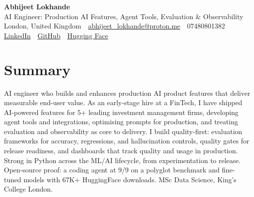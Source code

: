 \documentclass[10pt,a4paper]{article}
\newcommand{\sep}{\,\textcolor{accent!60}{\textbar}\,}
\begin{document}
\begin{center}
  {\fontsize{24}{26}\selectfont\bfseries Abhijeet Lokhande}\\[3pt]
  {\color{accent}\large AI Engineer: Production AI Features, Agent Tools, Evaluation \& Observability}\\[5pt]
  {\small
    London, United Kingdom \sep
    \href{mailto:abhijeet_lokhande@proton.me}{abhijeet\_lokhande@proton.me} \sep
    07480801382 \\[2pt]
    \href{https://www.linkedin.com/in/ablds/}{LinkedIn} \sep
    \href{https://github.com/abhijeetscode}{GitHub} \sep
    \href{https://huggingface.co/ab-ai}{Hugging Face}
  }
\end{center}
\vspace{2pt}

\section{Summary}
AI engineer who builds and enhances production AI product features that deliver measurable end-user value. As an early-stage hire at a FinTech, I have shipped AI-powered features for 5+ leading investment management firms, developing agent tools and integrations, optimising prompts for production, and treating evaluation and observability as core to delivery. I build quality-first: evaluation frameworks for accuracy, regressions, and hallucination controls, quality gates for release readiness, and dashboards that track quality and usage in production. Strong in Python across the ML/AI lifecycle, from experimentation to release. Open-source proof: a coding agent at 9/9 on a polyglot benchmark and fine-tuned models with 67K+ HuggingFace downloads. MSc Data Science, King's College London.

\end{document}
